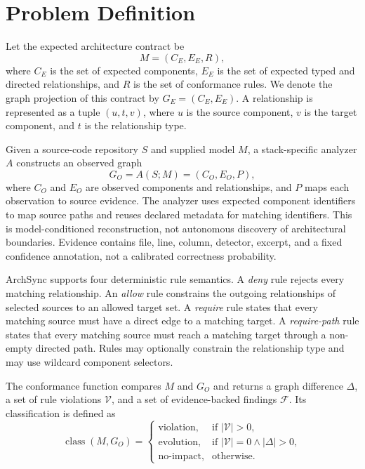 \section{Problem Definition}

Let the expected architecture contract be
\begin{equation}
  M = (C_E, E_E, R),
\end{equation}
where $C_E$ is the set of expected components, $E_E$ is the set of expected typed and directed relationships, and $R$ is the set of conformance rules. We denote the graph projection of this contract by $G_E=(C_E,E_E)$. A relationship is represented as a tuple $(u,t,v)$, where $u$ is the source component, $v$ is the target component, and $t$ is the relationship type.

Given a source-code repository $S$ and supplied model $M$, a stack-specific analyzer $A$ constructs an observed graph
\begin{equation}
  G_O = A(S;M) = (C_O, E_O, P),
\end{equation}
where $C_O$ and $E_O$ are observed components and relationships, and $P$ maps each observation to source evidence. The analyzer uses expected component identifiers to map source paths and reuses declared metadata for matching identifiers. This is model-conditioned reconstruction, not autonomous discovery of architectural boundaries. Evidence contains file, line, column, detector, excerpt, and a fixed confidence annotation, not a calibrated correctness probability.

ArchSync supports four deterministic rule semantics. A \emph{deny} rule rejects every matching relationship. An \emph{allow} rule constrains the outgoing relationships of selected sources to an allowed target set. A \emph{require} rule states that every matching source must have a direct edge to a matching target. A \emph{require-path} rule states that every matching source must reach a matching target through a non-empty directed path. Rules may optionally constrain the relationship type and may use wildcard component selectors.

The conformance function compares $M$ and $G_O$ and returns a graph difference $\Delta$, a set of rule violations $\mathcal{V}$, and a set of evidence-backed findings $\mathcal{F}$. Its classification is defined as
\begin{equation}
\operatorname{class}(M,G_O)=
\begin{cases}
\text{violation}, & \text{if } |\mathcal{V}| > 0,\\
\text{evolution}, & \text{if } |\mathcal{V}| = 0 \land |\Delta| > 0,\\
\text{no-impact}, & \text{otherwise.}
\end{cases}
\end{equation}

